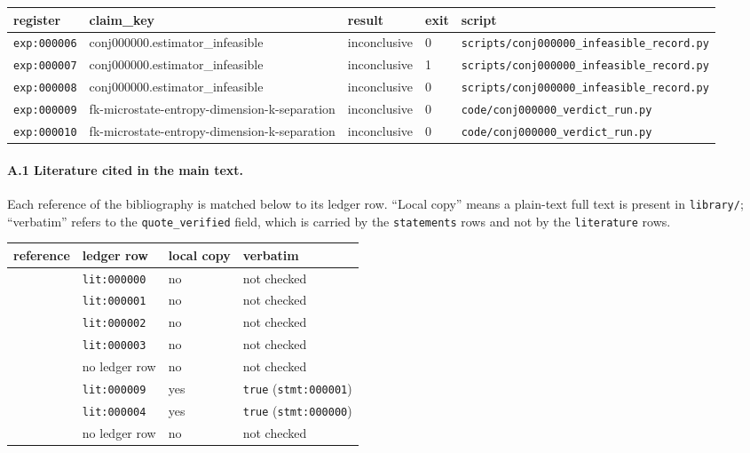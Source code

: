 \documentclass[11pt]{article}
\theoremstyle{plain}
\theoremstyle{definition}
\theoremstyle{remark}
\begin{document}
\begin{center}\small
\begin{tabular}{@{}lllll@{}}
\hline
register & claim\_key & result & exit & script \\
\hline
\texttt{exp:000006} & conj000000.estimator\_infeasible & inconclusive & 0 & \texttt{scripts/conj000000\_infeasible\_record.py} \\
\texttt{exp:000007} & conj000000.estimator\_infeasible & inconclusive & 1 & \texttt{scripts/conj000000\_infeasible\_record.py} \\
\texttt{exp:000008} & conj000000.estimator\_infeasible & inconclusive & 0 & \texttt{scripts/conj000000\_infeasible\_record.py} \\
\texttt{exp:000009} & fk-microstate-entropy-dimension-k-separation & inconclusive & 0 & \texttt{code/conj000000\_verdict\_run.py} \\
\texttt{exp:000010} & fk-microstate-entropy-dimension-k-separation & inconclusive & 0 & \texttt{code/conj000000\_verdict\_run.py} \\
\hline
\end{tabular}
\end{center}

\paragraph{A.1 Literature cited in the main text.} Each reference of the bibliography is matched below to its ledger row. ``Local copy'' means a plain-text full text is present in \texttt{library/}; ``verbatim'' refers to the \texttt{quote\_verified} field, which is carried by the \texttt{statements} rows and not by the \texttt{literature} rows.

\begin{center}\small
\begin{tabular}{@{}llll@{}}
\hline
reference & ledger row & local copy & verbatim \\
\hline
\cite{Dyk94} & \texttt{lit:000000} & no & not checked \\
\cite{PS20} & \texttt{lit:000001} & no & not checked \\
\cite{Hou09} & \texttt{lit:000002} & no & not checked \\
\cite{Voi99} & \texttt{lit:000003} & no & not checked \\
\cite{Voi94} & no ledger row & no & not checked \\
\cite{MS05} & \texttt{lit:000009} & yes & \texttt{true} (\texttt{stmt:000001}) \\
\cite{Sh06} & \texttt{lit:000004} & yes & \texttt{true} (\texttt{stmt:000000}) \\
\cite{At76} & no ledger row & no & not checked \\
\hline
\end{tabular}
\end{center}
\end{document}
